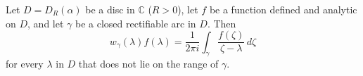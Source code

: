 Let $D = D_R(\alpha)$ be a disc in $\mathbb{C}$ ($R > 0$), let $f$ be a function defined and analytic on $D$, and let $\gamma$ be a closed rectifiable arc in $D$. Then
$$w_{\gamma}(\lambda) f(\lambda) = \frac{1}{2\pi i} \int_{\gamma} \frac{f(\zeta)}{\zeta - \lambda} \, d\zeta$$
for every $\lambda$ in $D$ that does not lie on the range of $\gamma$.
